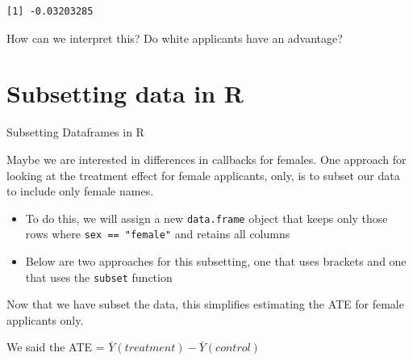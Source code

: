 \documentclass[
  letterpaper,
  DIV=11,
  numbers=noendperiod]{scrreprt}
\newenvironment{Shaded}{\begin{snugshade}}{\end{snugshade}}
\newcommand{\DocumentationTok}[1]{\textcolor[rgb]{0.37,0.37,0.37}{\textit{#1}}}
\newcommand{\FunctionTok}[1]{\textcolor[rgb]{0.28,0.35,0.67}{#1}}
\newcommand{\NormalTok}[1]{\textcolor[rgb]{0.00,0.23,0.31}{#1}}
\newcommand{\OtherTok}[1]{\textcolor[rgb]{0.00,0.23,0.31}{#1}}
\newcommand{\SpecialCharTok}[1]{\textcolor[rgb]{0.37,0.37,0.37}{#1}}
\newcommand{\StringTok}[1]{\textcolor[rgb]{0.13,0.47,0.30}{#1}}
\providecommand{\tightlist}{%
  \setlength{\itemsep}{0pt}\setlength{\parskip}{0pt}}\usepackage{longtable,booktabs,array}
\begin{document}
\begin{verbatim}
[1] -0.03203285
\end{verbatim}

How can we interpret this? Do white applicants have an advantage?

\hypertarget{subsetting-data-in-r}{%
\section{Subsetting data in R}\label{subsetting-data-in-r}}

Subsetting Dataframes in R

Maybe we are interested in differences in callbacks for females. One
approach for looking at the treatment effect for female applicants,
only, is to subset our data to include only female names.

\begin{itemize}
\tightlist
\item
  To do this, we will assign a new \texttt{data.frame} object that keeps
  only those rows where \texttt{sex\ ==\ "female"} and retains all
  columns
\item
  Below are two approaches for this subsetting, one that uses brackets
  and one that uses the \texttt{subset} function
\end{itemize}

\begin{Shaded}
\end{Shaded}

Now that we have subset the data, this simplifies estimating the ATE for
female applicants only.

We said the ATE = \(\bar{Y}(treatment) - \bar{Y}(control)\)

\begin{Shaded}
\end{Shaded}
\end{document}
